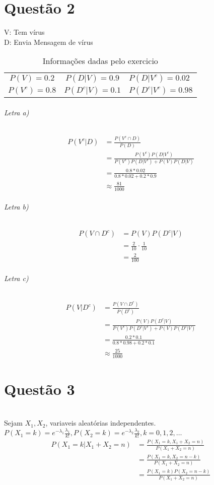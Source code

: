 \documentclass[10pt]{article}
\begin{document}
\chapter{Questão 2}
\newline
V: Tem vírus\\
D: Envia Mensagem de vírus
\begin{table}[h]
\begin{tabular}{lll}
  \toprule
\multicolumn{1}{c}{\(P(V) = 0.2\)} & \multicolumn{1}{c}{\(P(D| V) = 0.9\)} & \(P(D| V^c ) = 0.02\) \\
\(P(V^c) = 0.8\)  & \(P(D^c | V) = 0.1\) & \(P(D^c | V^c) = 0.98\)
\end{tabular}
\caption{Informações dadas pelo exercicio}
\label{tab:my-table}
\end{table}

\subparagraph{Letra a)}
\begin{align*}
  P(V^c | D) &= \frac{P(V^c \cap D)}{P(D)}\\
  &= \frac{P(V^c)P(D|V^c)}{P(V^c)P(D|V^c) + P(V)P(D|V)}\\
  &= \frac{0.8 * 0.02}{0.8*0.02 + 0.2*0.9}\\
  &\approx \frac{81}{1000}
\end{align*}

\subparagraph{Letra b)}
\begin{align*}
  P(V\cap D^c) &= P(V)P(D^c|V)\\
  &= \frac{2}{10} \cdot \frac{1}{10}\\
  &= \frac{2}{100}
\end{align*}

\subparagraph{Letra c)}
\begin{align*}
  P(V | D^c) &= \frac{P(V \cap D^c)}{P(D^c)}\\
  &= \frac{P(V)P(D^c|V)}{P(V^c)P(D^c|V^c) + P(V)P(D^c|V)}\\
  &= \frac{0.2 * 0.1}{0.8*0.98 + 0.2*0.1}\\
  &\approx \frac{25}{1000}
\end{align*}
\newpage
\chapter{Questão 3}\\
Sejam \(X_1, X_2\), variaveis aleatórias independentes.\\

\(P(X_1 = k) = e^{-\lambda_1} \frac{\lambda_1}{k!},P(X_2 = k) = e^{-\lambda_2} \frac{\lambda_2}{k!}, k=0,1,2,\dots\)\\
\begin{align*}
  P(X_1 = k | X_1 + X_2 = n) &= \frac{P( X_1 = k,X_1+X_2 = n)}{P(X_1+X_2 = n)}\\
  &= \frac{P(X_1 = k,X_2 = n-k)}{P(X_1+X_2 = n)}\\
  &= \frac{P(X_1 = k)P(X_2 = n-k)}{P(X_1+X_2 = n)}
\end{align*}
\end{document}
